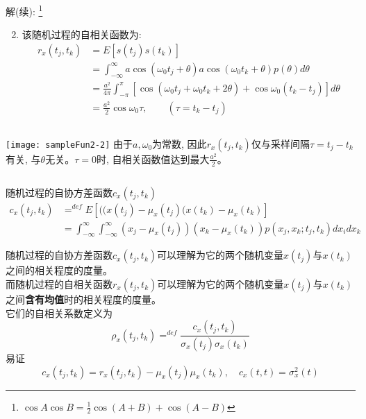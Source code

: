 \begin{frame}
解(续): \footnote{$\cos A\cos B=\frac{1}{2}\cos (A+B)+\cos(A-B)$}
\begin{enumerate}
\setcounter{enumi}{1} %
\item 该随机过程的自相关函数为:
\begin{align*}
r_x(t_j,t_k)&=E[s(t_j)s(t_k)]\\
&=\int_{-\infty}^{\infty}a\cos(\omega_0t_j+\theta)a\cos(\omega_0t_k+\theta)p(\theta)d\theta\\
&=\frac{a^2}{4\pi}\int_{-\pi}^{\pi}[\cos(\omega_0t_j+\omega_0t_k+2\theta)+\cos\omega_0(t_k-t_j)]d\theta\\
&=\frac{a^2}{2}\cos\omega_0\tau,\qquad(\tau=t_k-t_j)
\end{align*}
\end{enumerate}
\begin{columns}
	\texttt{[image: sampleFun2-2]}
	由于$a,\omega_0$为常数, 因此$r_x(t_j,t_k)$仅与采样间隔$\tau=t_j-t_k$有关, 与$\theta$无关。$\tau=0$时, 自相关函数值达到最大$\frac{a^2}{2}$。
\end{columns}
\end{frame}

\begin{frame}
\begin{block}{随机过程的自协方差函数$c_x(t_j,t_k)$}
\begin{align*}
c_x(t_j,t_k)&\mathop{=}^{def}E[((x(t_j)-\mu_x(t_j)(x(t_k)-\mu_x(t_k)]\\
&=\int_{-\infty}^{\infty}\int_{-\infty}^{\infty}(x_j-\mu_x(t_j))(x_k-\mu_x(t_k))p(x_j,x_k;t_j,t_k)dx_idx_k
\end{align*}
\end{block}
随机过程的自协方差函数$c_x(t_j,t_k)$可以理解为它的两个随机变量$x(t_j)$与$x(t_k)$之间的相关程度的度量。\\
而随机过程的自相关函数$r_x(t_j,t_k)$可以理解为它的两个随机变量$x(t_j)$与$x(t_k)$之间\textbf{含有均值}时的相关程度的度量。\\
它们的自相关系数定义为
\[\rho_x(t_j,t_k)\mathop{=}^{def}\frac{c_x(t_j,t_k)}{\sigma_x(t_j)\sigma_x(t_k)}\]
易证
\[c_x(t_j,t_k)=r_x(t_j,t_k)-\mu_x(t_j)\mu_x(t_k),\quad c_x(t,t)=\sigma_x^2(t)\]
\end{frame}

